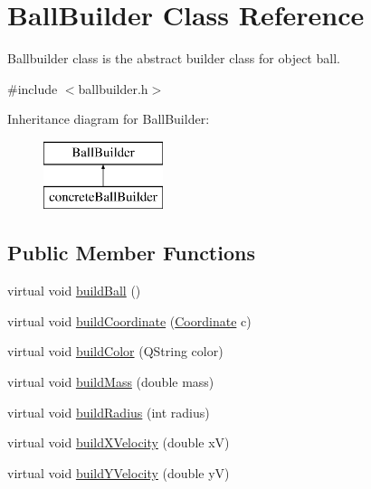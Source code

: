 \hypertarget{class_ball_builder}{}\section{Ball\+Builder Class Reference}
\label{class_ball_builder}


Ballbuilder class is the abstract builder class for object ball.  




{\ttfamily \#include $<$ballbuilder.\+h$>$}

Inheritance diagram for Ball\+Builder\+:\begin{figure}[H]
\begin{center}
\leavevmode
\includegraphics[height=2.000000cm]{class_ball_builder}
\end{center}
\end{figure}
\subsection*{Public Member Functions}
\begin{DoxyCompactItemize}
\item 
virtual void \mbox{\hyperlink{class_ball_builder_a5dc064067607fa4ef22db5901cca9e62}{build\+Ball}} ()
\item 
virtual void \mbox{\hyperlink{class_ball_builder_a0ca1344197192ea0f5aa5b7104e5f876}{build\+Coordinate}} (\mbox{\hyperlink{class_coordinate}{Coordinate}} c)
\item 
virtual void \mbox{\hyperlink{class_ball_builder_a0cd696c49074e3923a76ec8aed10ad45}{build\+Color}} (Q\+String color)
\item 
virtual void \mbox{\hyperlink{class_ball_builder_a6514a4ef81d56ba21708783cce473e4e}{build\+Mass}} (double mass)
\item 
virtual void \mbox{\hyperlink{class_ball_builder_af101d6eac3453fd0fda02b8900b49e8f}{build\+Radius}} (int radius)
\item 
virtual void \mbox{\hyperlink{class_ball_builder_a9139eedc191ad41fa221f06902646d4b}{build\+X\+Velocity}} (double xV)
\item 
virtual void \mbox{\hyperlink{class_ball_builder_a1687bc4c363f259dd38b0d7d6ac92e57}{build\+Y\+Velocity}} (double yV)
\end{DoxyCompactItemize}


